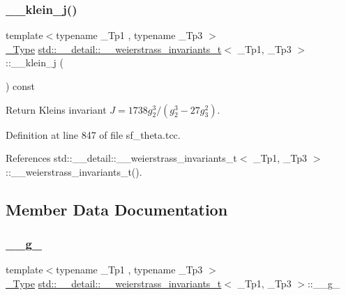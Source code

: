 \subsubsection{\texorpdfstring{\+\_\+\+\_\+klein\+\_\+j()}{\_\_klein\_j()}}
{\footnotesize\ttfamily template$<$typename \+\_\+\+Tp1 , typename \+\_\+\+Tp3 $>$ \\
\hyperlink{structstd_1_1____detail_1_1____weierstrass__invariants__t_a9992ab3f07a514203487c0760d76173f}{\+\_\+\+Type} \hyperlink{structstd_1_1____detail_1_1____weierstrass__invariants__t}{std\+::\+\_\+\+\_\+detail\+::\+\_\+\+\_\+weierstrass\+\_\+invariants\+\_\+t}$<$ \+\_\+\+Tp1, \+\_\+\+Tp3 $>$\+::\+\_\+\+\_\+klein\+\_\+j (\begin{DoxyParamCaption}{ }\end{DoxyParamCaption}) const\hspace{0.3cm}{\ttfamily [inline]}}



Return Klein\textquotesingle{}s invariant $ J = 1738 g_2^3 / (g_2^3 - 27 g_3^2) $. 



Definition at line 847 of file sf\+\_\+theta.\+tcc.



References std\+::\+\_\+\+\_\+detail\+::\+\_\+\+\_\+weierstrass\+\_\+invariants\+\_\+t$<$ \+\_\+\+Tp1, \+\_\+\+Tp3 $>$\+::\+\_\+\+\_\+weierstrass\+\_\+invariants\+\_\+t().



\subsection{Member Data Documentation}
\mbox{\label{structstd_1_1____detail_1_1____weierstrass__invariants__t_aca0be8978b83ec9a892cf9b5b39019ec}} 
\subsubsection{\texorpdfstring{\+\_\+\+\_\+g\+\_}{\_\_g\_2}}
{\footnotesize\ttfamily template$<$typename \+\_\+\+Tp1 , typename \+\_\+\+Tp3 $>$ \\
\hyperlink{structstd_1_1____detail_1_1____weierstrass__invariants__t_a9992ab3f07a514203487c0760d76173f}{\+\_\+\+Type} \hyperlink{structstd_1_1____detail_1_1____weierstrass__invariants__t}{std\+::\+\_\+\+\_\+detail\+::\+\_\+\+\_\+weierstrass\+\_\+invariants\+\_\+t}$<$ \+\_\+\+Tp1, \+\_\+\+Tp3 $>$\+::\+\_\+\+\_\+g\+\_}



